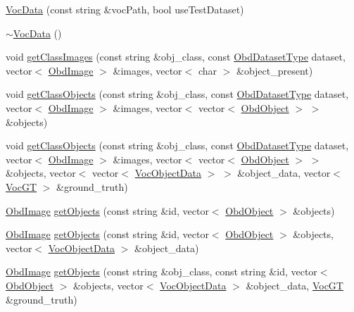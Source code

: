 \begin{DoxyCompactItemize}
\item 
\hyperlink{classVocData_add6a2dc980a8e27ac39d6d03c08bc1cd}{Voc\-Data} (const string \&voc\-Path, bool use\-Test\-Dataset)
\item 
\hyperlink{classVocData_a575a2fec25b9ba78e6ff9bdc33336ad3}{$\sim$\-Voc\-Data} ()
\item 
void \hyperlink{classVocData_a92f58a9b3f73c2fbea3d80df27a5d1fc}{get\-Class\-Images} (const string \&obj\-\_\-class, const \hyperlink{bagofwords__classification_8cpp_a769a10790da271430ddd42e42073a0ea}{Obd\-Dataset\-Type} dataset, vector$<$ \hyperlink{classObdImage}{Obd\-Image} $>$ \&images, vector$<$ char $>$ \&object\-\_\-present)
\item 
void \hyperlink{classVocData_aee09184f35d00681609ff4605021a083}{get\-Class\-Objects} (const string \&obj\-\_\-class, const \hyperlink{bagofwords__classification_8cpp_a769a10790da271430ddd42e42073a0ea}{Obd\-Dataset\-Type} dataset, vector$<$ \hyperlink{classObdImage}{Obd\-Image} $>$ \&images, vector$<$ vector$<$ \hyperlink{classObdObject}{Obd\-Object} $>$ $>$ \&objects)
\item 
void \hyperlink{classVocData_a8ceef9c32fa3cbc4094e924c46732e9f}{get\-Class\-Objects} (const string \&obj\-\_\-class, const \hyperlink{bagofwords__classification_8cpp_a769a10790da271430ddd42e42073a0ea}{Obd\-Dataset\-Type} dataset, vector$<$ \hyperlink{classObdImage}{Obd\-Image} $>$ \&images, vector$<$ vector$<$ \hyperlink{classObdObject}{Obd\-Object} $>$ $>$ \&objects, vector$<$ vector$<$ \hyperlink{classVocObjectData}{Voc\-Object\-Data} $>$ $>$ \&object\-\_\-data, vector$<$ \hyperlink{bagofwords__classification_8cpp_a79995288ef1b2b5890517068e9bdfed8}{Voc\-G\-T} $>$ \&ground\-\_\-truth)
\item 
\hyperlink{classObdImage}{Obd\-Image} \hyperlink{classVocData_a6e4ecde19100ecfeb8c1f9afc12fc977}{get\-Objects} (const string \&id, vector$<$ \hyperlink{classObdObject}{Obd\-Object} $>$ \&objects)
\item 
\hyperlink{classObdImage}{Obd\-Image} \hyperlink{classVocData_a70c269f14e0e71abdc207c9910a74aab}{get\-Objects} (const string \&id, vector$<$ \hyperlink{classObdObject}{Obd\-Object} $>$ \&objects, vector$<$ \hyperlink{classVocObjectData}{Voc\-Object\-Data} $>$ \&object\-\_\-data)
\item 
\hyperlink{classObdImage}{Obd\-Image} \hyperlink{classVocData_a427c35f84d11424b071d5bfc11ac8fda}{get\-Objects} (const string \&obj\-\_\-class, const string \&id, vector$<$ \hyperlink{classObdObject}{Obd\-Object} $>$ \&objects, vector$<$ \hyperlink{classVocObjectData}{Voc\-Object\-Data} $>$ \&object\-\_\-data, \hyperlink{bagofwords__classification_8cpp_a79995288ef1b2b5890517068e9bdfed8}{Voc\-G\-T} \&ground\-\_\-truth)

\end{DoxyCompactItemize}

